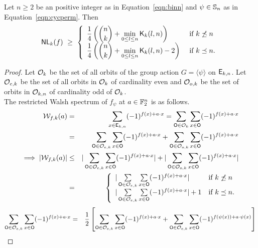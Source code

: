 \documentclass{llncs}
\begin{document}
\begin{theorem}
Let $n \geq 2$ be an positive integer as in Equation~\ref{eqn:binn} and $\psi \in \mathbb{S}_n$ as in Equation~\ref{eqn:cycperm}.
Then $$\mathsf{NL}_{k}(f) ~\geq ~ 
\left\{ \begin{array}{ll}
\displaystyle{\frac{1}{4}\left({n \choose k} + \min_{0 \leq l \leq n} \mathsf{K}_{k}(l,n)\right)}  & \text{ if }  k \not\preceq n \\
\displaystyle{\frac{1}{4}\left({n \choose k} + \min_{0 \leq l \leq n} \mathsf{K}_{k}(l,n) - 2\right)} & \text{ if } k \preceq n.
\end{array}   \right.$$
\end{theorem}
\begin{proof}
Let $\mathcal{O}_k$ be the set of all orbits of the group action $G = \langle \psi \rangle$ on $\mathsf{E}_{k,n}$.
Let $\mathcal{O}_{e,k}$ be the set of all orbits in $\mathcal{O}_k$ of cardinality even and $\mathcal{O}_{o,k}$ be the set of orbits in $\mathcal{O}_{k,n}$ of cardinality odd of $\mathcal{O}_k$. \\
The restricted Walsh spectrum of $f_\psi$ at $a \in \mathbb{F}_2^n$ is as follows.
\begin{eqnarray} \label{eqn:ws_k}
\mathcal{W}_{f,k}(a) & =  & \sum_{x \in \mathsf{E}_{k,n}} (-1)^{f(x)+a \cdot x} 
= \sum_{\mathsf{O} \in \mathcal{O}_k} \sum_{x \in \mathsf{O}} (-1)^{f(x)+ a \cdot x} \nonumber \\ 
& = &\sum_{\mathsf{O} \in \mathcal{O}_{e,k}} \sum_{x \in \mathsf{O}} (-1)^{ f(x) + a \cdot x} + \sum_{\mathsf{O} \in \mathcal{O}_{o,k}} \sum_{x \in \mathsf{O}} (-1)^{ f(x) + a \cdot x} \nonumber \\
\implies |\mathcal{W}_{f,k}(a)| & \leq  & |\sum_{\mathsf{O} \in \mathcal{O}_{e,k}} \sum_{x \in \mathsf{O}} (-1)^{ f(x) + a \cdot x}| + | \sum_{\mathsf{O} \in \mathcal{O}_{o,k}} \sum_{x \in \mathsf{O}} (-1)^{ f(x) + a \cdot x}| \nonumber\\
& = & \left\{\begin{array}{ll}
    |\sum\limits_{\mathsf{O} \in \mathcal{O}_{e,k}} \sum\limits_{x \in \mathsf{O}} (-1)^{ f(x) + a \cdot x}| & \text{if } k \not\preceq n\\
    |\sum\limits_{\mathsf{O} \in \mathcal{O}_{e,k}} \sum\limits_{x \in \mathsf{O}} (-1)^{ f(x) + a \cdot x}| + 1 & \text{if } k \preceq n.
    \end{array}\right.
\end{eqnarray}
\begin{eqnarray*}\label{eqn:wse_k}
\sum_{\orb \in \orbs_{e,k}} \sum_{x \in \orb} (-1)^{ f(x) + a \cdot x} & = &
\frac{1}{2} \left[ \sum_{\orb \in \orbs_{e,k}} \sum_{x \in \orb} (-1)^{ f(x) + a \cdot x} + \sum_{\orb \in \orbs_{e,k}} \sum_{x \in \orb} (-1)^{ f(\psi(x)) + a \cdot \psi(x)} \right]  \nonumber \\

\end{eqnarray*}
\end{proof}
\end{document}
